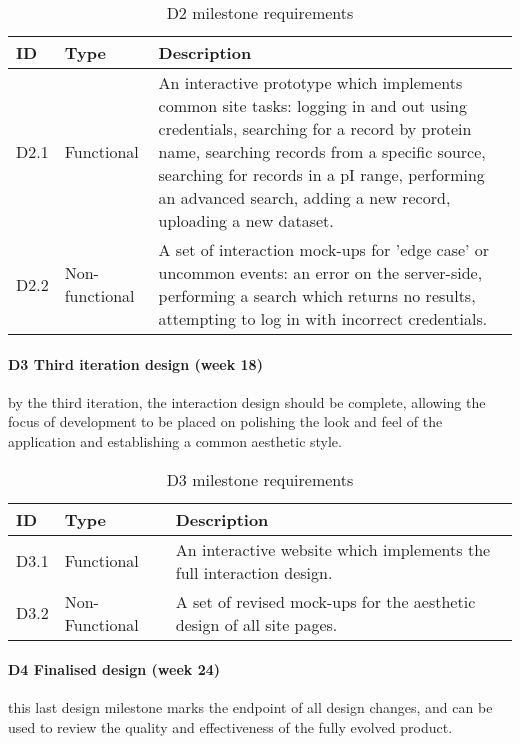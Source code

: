 \begin{table}[H]
\centering
\begin{tabular}{ l l p{12cm} }
\textbf{ID} & \textbf{Type} & \textbf{Description}\\ \hline

D2.1 & Functional & An interactive prototype which implements common site tasks:
logging in and out using credentials, searching for a record by protein name,
searching records from a specific source, searching for records in a pI range,
performing an advanced search, adding a new record, uploading a new dataset.\\

D2.2 & Non-functional & A set of interaction mock-ups for 'edge case' or
uncommon events: an error on the server-side, performing a search which returns
no results, attempting to log in with incorrect credentials.\\

\hline
\end{tabular}
\caption{D2 milestone requirements}
\label{tab:d2-requirements}
\end{table}

\paragraph{D3 Third iteration design (week 18)} by the third iteration, the
interaction design should be complete, allowing the focus of development to be
placed on polishing the look and feel of the application and establishing a
common aesthetic style.

\begin{table}[H]
\centering
\begin{tabular}{ l l p{12cm} }
\textbf{ID} & \textbf{Type} & \textbf{Description}\\ \hline

D3.1 & Functional & An interactive website which implements the full interaction
design.\\

D3.2 & Non-Functional & A set of revised mock-ups for the aesthetic design of
all site pages.\\

\hline
\end{tabular}
\caption{D3 milestone requirements}
\label{tab:d3-requirements}
\end{table}

\paragraph{D4 Finalised design (week 24)} this last design milestone marks the
endpoint of all design changes, and can be used to review the quality and
effectiveness of the fully evolved product.

